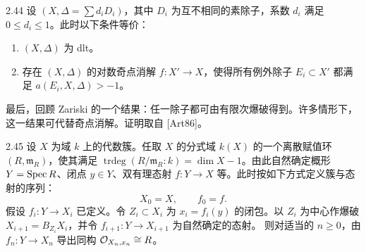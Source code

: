 \begin{theorem}[{[Sza95]}]{2.44}
设 $(X,\Delta=\sum d_iD_i)$，其中 $D_i$ 为互不相同的素除子，系数 $d_i$ 满足 $0\le d_i\le 1$。此时以下条件等价：
\begin{enumerate}[label=（\arabic*）,leftmargin=2.8em]
\item $(X,\Delta)$ 为 dlt。
\item 存在 $(X,\Delta)$ 的对数奇点消解 $f:X'\to X$，使得所有例外除子 $E_i\subset X'$ 都满足 $a(E_i,X,\Delta)>-1$。
\end{enumerate}
\end{theorem}

最后，回顾 Zariski 的一个结果：任一除子都可由有限次爆破得到。许多情形下，这一结果可代替奇点消解。证明取自 [Art86]。

\begin{lemmap}{2.45}
设 $X$ 为域 $k$ 上的代数簇。任取 $X$ 的分式域 $k(X)$ 的一个离散赋值环 $(R,\mathfrak m_R)$，使其满足 $\operatorname{trdeg}(R/\mathfrak m_R:k)=\dim X-1$。由此自然确定概形 $Y=\operatorname{Spec} R$、闭点 $y\in Y$、双有理态射 $f:Y\to X$ 等。此时按如下方式定义簇与态射的序列：
\[
X_0=X,\qquad f_0=f.
\]
假设 $f_i:Y\to X_i$ 已定义。令 $Z_i\subset X_i$ 为 $x_i=f_i(y)$ 的闭包。以 $Z_i$ 为中心作爆破 $X_{i+1}=B_{Z_i}X_i$，并令 $f_{i+1}:Y\to X_{i+1}$ 为自然确定的态射。
则对适当的 $n\ge 0$，由 $f_n:Y\to X_n$ 导出同构 $\mathcal{O}_{X_n,x_n}\cong R$。
\end{lemmap}

